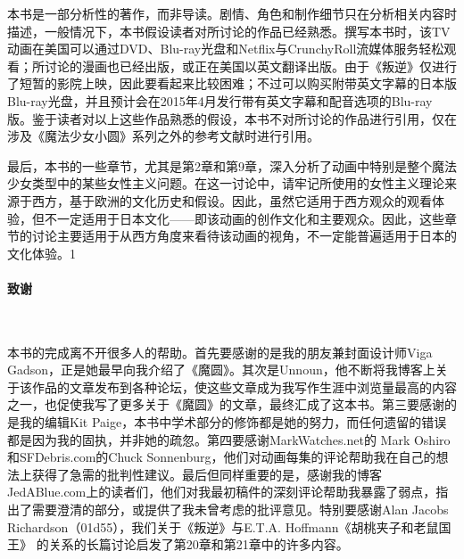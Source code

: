 本书是一部分析性的著作，而非导读。剧情、角色和制作细节只在分析相关内容时描述，一般情况下，本书假设读者对所讨论的作品已经熟悉。撰写本书时，该TV动画在美国可以通过DVD、Blu-ray光盘和Netflix与CrunchyRoll流媒体服务轻松观看；所讨论的漫画也已经出版，或正在美国以英文翻译出版。由于《叛逆》仅进行了短暂的影院上映，因此要看起来比较困难；不过可以购买附带英文字幕的日本版Blu-ray光盘，并且预计会在2015年4月发行带有英文字幕和配音选项的Blu-ray版。鉴于读者对以上这些作品熟悉的假设，本书不对所讨论的作品进行引用，仅在涉及《魔法少女小圆》系列之外的参考文献时进行引用。

最后，本书的一些章节，尤其是第2章和第9章，深入分析了动画中特别是整个魔法少女类型中的某些女性主义问题。在这一讨论中，请牢记所使用的女性主义理论来源于西方，基于欧洲的文化历史和假设。因此，虽然它适用于西方观众的观看体验，但不一定适用于日本文化——即该动画的创作文化和主要观众。因此，这些章节的讨论主要适用于从西方角度来看待该动画的视角，不一定能普遍适用于日本的文化体验。1

\paragraph{致谢}~{}

本书的完成离不开很多人的帮助。首先要感谢的是我的朋友兼封面设计师Viga Gadson，正是她最早向我介绍了《魔圆》。其次是Unnoun，他不断将我博客上关于该作品的文章发布到各种论坛，使这些文章成为我写作生涯中浏览量最高的内容之一，也促使我写了更多关于《魔圆》的文章，最终汇成了这本书。第三要感谢的是我的编辑Kit Paige，本书中学术部分的修饰都是她的努力，而任何遗留的错误都是因为我的固执，并非她的疏忽。第四要感谢MarkWatches.net的 Mark Oshiro和SFDebris.com的Chuck Sonnenburg，他们对动画每集的评论帮助我在自己的想法上获得了急需的批判性建议。最后但同样重要的是，感谢我的博客JedABlue.com上的读者们，他们对我最初稿件的深刻评论帮助我暴露了弱点，指出了需要澄清的部分，或提供了我未曾考虑的批评意见。特别要感谢Alan Jacobs Richardson（01d55），我们关于《叛逆》与E.T.A. Hoffmann《胡桃夹子和老鼠国王》 \cite{ref11} 的关系的长篇讨论启发了第20章和第21章中的许多内容。
